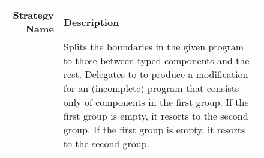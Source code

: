 \begin{figure}[htb]
 
  \newcommand{\desc}[1]{\parbox[t]{21.5em}{#1}}

 
  \def\desca{\desc{Splits the boundaries in the given program to those
  between typed components and the rest.  Delegates to \featopt{} to
  produce a modification for an (incomplete) program that consists only of
  components in the first group. If the first group is empty, it resorts
  to the second group.  If the first group is empty, it resorts to the
  second group.}}

   \def\descb{\desc{Same as \featcostopt{} except that it delegates 
   to \featcon{}.}}

   \def\descc{\desc{Separates the typed components   that have boundaries
   with other typed components from the rest of the components in the
   given program. Delegates to \statselfopt{} to produce a modification
   for an (incomplete) program that consists only of components in the
   first group. If the first group is empty, it resorts to the second
   group.}}

   \def\descd{\desc{Same as \statselfcostopt{} except that it delegates 
   to \stattotalopt{}.}}

   \def\desce{\desc{Same as \statselfcostopt{} except that it delegates 
   to \statselfcon{}.}}

   \def\descf{\desc{Same as \statselfcostopt{} except that it delegates 
   to \stattotalcon{}.}}

   \def\descg{\desc{If the number of typed components in the given program 
   is above a threshold $N$, it delegates to \featopt{}. Otherwise, it
   delegates to \featcon{}.}}

    \def\desch{\desc{Same as \featconf{} except that it delegates 
   to \statselfopt{} or \statselfcon{}.}}

    \def\descj{\desc{Same as \featconf{} except that it delegates 
   to \stattotalopt{} or \stattotalcon{}.}}



 \begin{tabular}{r|l}
    {\bf Strategy Name} & {\bf Description} \\\hline
    \featcostopt{}      &   \desca           \\\hline
    \featcostcon{}      &   \descb           \\\hline
  

\end{tabular}
\end{figure}

